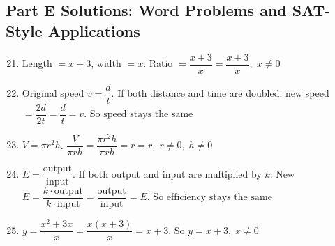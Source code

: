 \documentclass[14pt]{extarticle}
\begin{document}
\subsection*{Part E Solutions: Word Problems and SAT-Style Applications}
\begin{enumerate}
  \setcounter{enumi}{20}
  \item Length \(= x+3\), width \(= x\).  
  Ratio \(= \dfrac{x+3}{x}
  = \boxed{\dfrac{x+3}{x}}, \; x \ne 0\)

  \item Original speed \(v = \dfrac{d}{t}\).  
  If both distance and time are doubled: new speed \(= \dfrac{2d}{2t} = \dfrac{d}{t} = v\).  
  So \(\boxed{\text{speed stays the same}}\)

  \item \(V = \pi r^2 h\).  
  \(\dfrac{V}{\pi r h}
  = \dfrac{\pi r^2 h}{\pi r h}
  = r
  = \boxed{r}, \; r \ne 0,\; h \ne 0\)

  \item \(E = \dfrac{\text{output}}{\text{input}}\).  
  If both output and input are multiplied by \(k\):  
  New \(E = \dfrac{k \cdot \text{output}}{k \cdot \text{input}}
  = \dfrac{\text{output}}{\text{input}}
  = E\).  
  So \(\boxed{\text{efficiency stays the same}}\)

  \item \(y = \dfrac{x^2 + 3x}{x}
  = \dfrac{x(x+3)}{x}
  = x+3\).  
  So \(y = \boxed{x+3}, \; x \ne 0\)
\end{enumerate}





\end{document}
